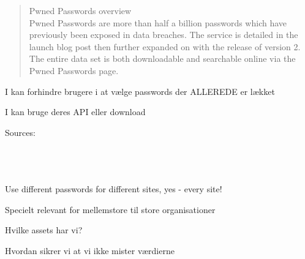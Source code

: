 \documentclass[Screen16to9,17pt]{foils}
\begin{document}
\begin{quote}
Pwned Passwords overview\\
Pwned Passwords are more than half a billion passwords which have previously been exposed in data breaches. The service is detailed in the launch blog post then further expanded on with the release of version 2. The entire data set is both downloadable and searchable online via the Pwned Passwords page.
\end{quote}

\begin{list1}
\item I kan forhindre brugere i at vælge passwords der ALLEREDE er lækket
\item I kan bruge deres API eller download\\
{\footnotesize{}}
\end{list1}






 Sources:\\
{\footnotesize{}\\
\\
\\
}

\vskip 5mm
\centerline{Use different passwords for different sites, yes - every site!}





\begin{list2}
\item Specielt relevant for mellemstore til store organisationer
\item Hvilke assets har vi?
\item Hvordan sikrer vi at vi ikke mister værdierne
\end{list2}
\end{document}
